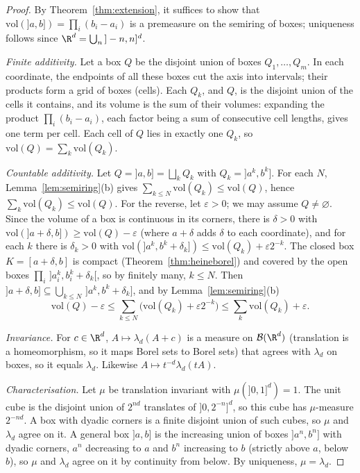 \begin{proof}
By Theorem~\ref{thm:extension}, it suffices to show that $\mathrm{vol}(]a,b])=\prod_i(b_i-a_i)$ is a premeasure on the semiring of boxes; uniqueness follows since $\R^d=\bigcup_n\,]-n,n]^d$.

\emph{Finite additivity.} Let a box $Q$ be the disjoint union of boxes $Q_1,\dots,Q_m$. In each coordinate, the endpoints of all these boxes cut the axis into intervals;
their products form a grid of boxes (cells). Each $Q_k$, and $Q$, is the disjoint union of the cells it contains, and its volume is the sum of their volumes:
expanding the product $\prod_i(b_i-a_i)$, each factor being a sum of consecutive cell lengths, gives one term per cell. Each cell of $Q$ lies in exactly one $Q_k$,
so $\mathrm{vol}(Q)=\sum_k\mathrm{vol}(Q_k)$.

\emph{Countable additivity.} Let $Q=]a,b]=\bigsqcup_kQ_k$ with $Q_k=]a^k,b^k]$. For each $N$, Lemma~\ref{lem:semiring}(b) gives $\sum_{k\le N}\mathrm{vol}(Q_k)\le\mathrm{vol}(Q)$, hence $\sum_k\mathrm{vol}(Q_k)\le\mathrm{vol}(Q)$. For the
reverse, let $\varepsilon>0$; we may assume $Q\ne\varnothing$. Since the volume of a box is continuous in its corners, there is $\delta>0$ with $\mathrm{vol}(]a+\delta,b])\ge\mathrm{vol}(Q)-\varepsilon$ (where
$a+\delta$ adds $\delta$ to each coordinate), and for each $k$ there is $\delta_k>0$ with $\mathrm{vol}(]a^k,b^k+\delta_k])\le\mathrm{vol}(Q_k)+\varepsilon2^{-k}$. The closed box $K=[a+\delta,b]$ is compact
(Theorem~\ref{thm:heineborel}) and covered by the open boxes $\prod_i\,]a^k_i,b^k_i+\delta_k[$, so by finitely many, $k\le N$. Then $]a+\delta,b]\subseteq\bigcup_{k\le N}\,]a^k,b^k+\delta_k]$, and by Lemma~\ref{lem:semiring}(b)
\[\mathrm{vol}(Q)-\varepsilon\le\sum_{k\le N}\bigl(\mathrm{vol}(Q_k)+\varepsilon2^{-k}\bigr)\le\sum_k\mathrm{vol}(Q_k)+\varepsilon.\]

\emph{Invariance.} For $c\in\R^d$, $A\mapsto\lambda_d(A+c)$ is a measure on $\mathcal B(\R^d)$ (translation is a homeomorphism, so it maps Borel sets to Borel sets) that agrees with
$\lambda_d$ on boxes, so it equals $\lambda_d$. Likewise $A\mapsto t^{-d}\lambda_d(tA)$.

\emph{Characterisation.} Let $\mu$ be translation invariant with $\mu(]0,1]^d)=1$. The unit cube is the disjoint union of $2^{nd}$ translates of $]0,2^{-n}]^d$, so this cube has
$\mu$-measure $2^{-nd}$. A box with dyadic corners is a finite disjoint union of such cubes, so $\mu$ and $\lambda_d$ agree on it. A general box $]a,b]$ is the increasing union of
boxes $]a^n,b^n]$ with dyadic corners, $a^n$ decreasing to $a$ and $b^n$ increasing to $b$ (strictly above $a$, below $b$), so $\mu$ and $\lambda_d$ agree on it by continuity
from below. By uniqueness, $\mu=\lambda_d$.
\end{proof}


